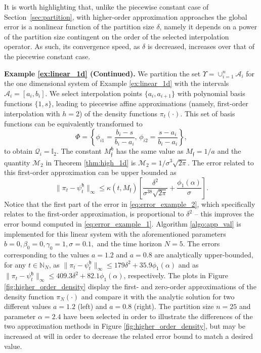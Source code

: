 \documentclass{LMCS}
\begin{document}
It is worth highlighting that, 
unlike the piecewise constant case of Section~\ref{sec:partition}, 
with higher-order approximation approaches the global error is a nonlinear function of the partition size $\delta$, 
namely it depends on a power of the partition size contingent on the order of the selected interpolation operator. 
As such, its convergence speed, as $\delta$ is decreased, increases over that of the piecewise constant case. 

\medskip

\noindent\textbf{Example \ref{ex:linear_1d} (Continued).} 
We partition the set $\Upsilon = \cup_{i=1}^{n}\mathcal A_i$ for the one dimensional system of Example \ref{ex:linear_1d} with the intervals $\mathcal A_i = [a_i,b_i]$.
We select interpolation points $\{a_i,a_{i+1}\}$ with polynomial basis functions $\{1,s\}$, 
leading to piecewise affine approximations (namely, first-order interpolation with $h = 2$) of the density functions $\pi_t(\cdot)$. 
This set of basis functions can be equivalently transformed to 
\begin{equation*}
\Phi = \left\{\phi_{i1} = \frac{b_i-s}{b_i-a_i},\,\phi_{i2} = \frac{s-a_i}{b_i-a_i}\right\},
\end{equation*}
to obtain $\mathcal Q_i = \mathbb I_2$. 
The constant $M_{\mathfrak f}^{\mathfrak h}$ has the same value as $M_{\mathfrak f}=1/a$ and the quantity $\mathcal M_2$ in Theorem \ref{thm:high_1d} is $\mathcal M_2 = 1/\sigma^3\sqrt{2\pi}$. The error related to this first-order approximation can be upper bounded as
\begin{equation}
\label{eq:error_example_2}
\|\pi_t-\psi_t^{\mathfrak h}\|_\infty\le
\kappa(t,M_{\mathfrak f})\left[\frac{\delta^2}{\sigma^38\sqrt{2\pi}}+\frac{\phi_1(\alpha)}{\sigma}\right].
\end{equation}
Notice that the first part of the error in \eqref{eq:error_example_2}, 
which specifically relates to the first-order approximation,  
is proportional to $\delta^2$ -- this improves the error bound computed in \eqref{eq:error_example_1}.
Algorithm \ref{algo:app_val} is implemented for this linear system with the aforementioned parameters
$b=0,\beta_0 = 0,\gamma_0 = 1,\sigma = 0.1,$ and the time horizon $N=5$. 
The errors corresponding to the values $a = 1.2$ and $a = 0.8$ are analytically upper-bounded, 
for any $t\in\mathbb N_N$, as 
$\|\pi_t-\psi_t^{\mathfrak h}\|_\infty\le 179\delta^2+35.9\phi_1(\alpha)$
and as $\|\pi_t-\psi_t^{\mathfrak h}\|_\infty\le 409.3\delta^2+82.1\phi_1(\alpha)$,
respectively.  
The plots in Figure \ref{fig:higher_order_density} display the first- and zero-order approximations of the density function $\pi_N(\cdot)$ and compare it with the analytic solution for two different values $a = 1.2$ (left) and $a = 0.8$ (right). 
The partition size $n = 25$ and parameter $\alpha = 2.4$ have been selected in order to illustrate the differences of the two approximation methods in Figure \ref{fig:higher_order_density},
but may be increased at will in order to decrease the related error bound to match a desired value. 
\end{document}
